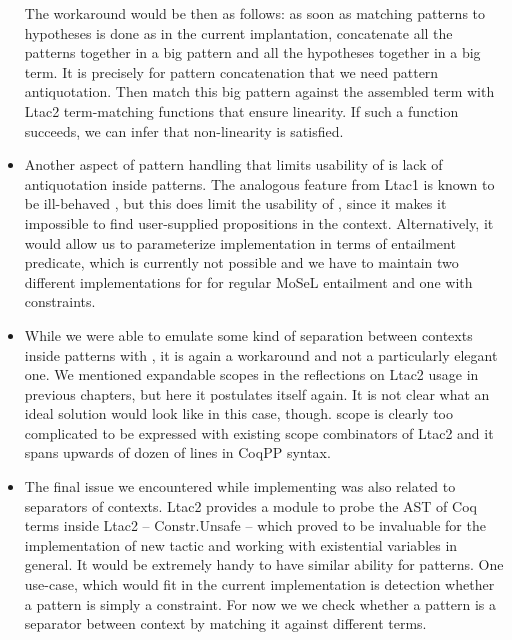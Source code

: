 \begin{itemize}
    The workaround would be then as follows: as soon as matching patterns to hypotheses is done as in the current implantation, concatenate all the patterns together in a big pattern and all the hypotheses together in a big term.
    It is precisely for pattern concatenation that we need pattern antiquotation.
    Then match this big pattern against the assembled term with Ltac2 term-matching functions that ensure linearity.
    If such a function succeeds, we can infer that non-linearity is satisfied.
\item Another aspect of pattern handling that limits usability of  is lack of  antiquotation inside patterns.
  The analogous feature from Ltac1 is known to be ill-behaved \cite{PatternEvarValue, MultipleOccurrencesSame}, but this does limit the usability of , since it makes it impossible to find user-supplied propositions in the context.
  Alternatively, it would allow us to parameterize implementation in terms of entailment predicate, which is currently not possible and we have to maintain two different implementations for  for regular MoSeL entailment and one with constraints.
\item While we were able to emulate some kind of separation between contexts inside patterns with \coqe{_ : $\Vert$}, it is again a workaround and not a particularly elegant one.
  We mentioned expandable scopes in the reflections on Ltac2 usage in previous chapters, but here it postulates itself again.
  It is not clear what an ideal solution would look like in this case, though.
   scope is clearly too complicated to be expressed with existing scope combinators of Ltac2 and it spans upwards of dozen of lines in CoqPP syntax.
\item The final issue we encountered while implementing  was also related to separators of contexts.
  Ltac2 provides a module to probe the AST of Coq terms inside Ltac2 -- Constr.Unsafe -- which proved to be invaluable for the implementation of new  tactic and working with existential variables in general.
  It would be extremely handy to have similar ability for patterns.
  One use-case, which would fit in the current implementation is detection whether a pattern is simply a constraint.
  For now we we check whether a pattern is a separator between context by matching it against different terms.
\end{itemize}

